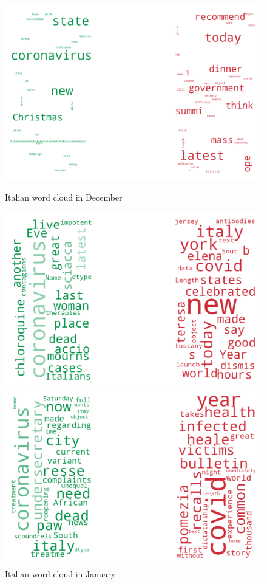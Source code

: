\begin{landscape}
\begin{figure}[!htb]
  \includegraphics[width=\linewidth]{December it word cloud.png}
  \caption{Italian word cloud in December}\label{fig:decemberit}
\endminipage\hfill
{}
  \includegraphics[width=\linewidth]{January it word cloud.png}
  \caption{Italian word cloud in January}\label{fig:januaryit}
\endminipage\hfill
{}
  \includegraphics[width=\linewidth]{February it word cloud.png}

\end{figure}
\end{landscape}

